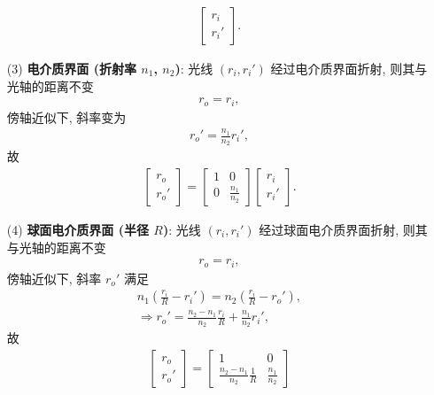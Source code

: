 \documentclass{note}
\begin{document}
\begin{pf}
\begin{itemize}
\begin{align}
\begin{bmatrix}
                r_i\\
                r_i'
            \end{bmatrix}.
        \end{align}
        \item[(3)] \textbf{电介质界面 (折射率 $n_1$, $n_2$)}: 光线 $(r_i,r_i')$ 经过电介质界面折射, 则其与光轴的距离不变
        \begin{align}
            r_o=r_i,
        \end{align}
        傍轴近似下, 斜率变为
        \begin{align}
            r_o'=\frac{n_1}{n_2}r_i',
        \end{align}
        故
        \begin{align}
            \begin{bmatrix}
                r_o\\
                r_o'
            \end{bmatrix}=\begin{bmatrix}
                1&0\\
                0&\frac{n_1}{n_2}
            \end{bmatrix}\begin{bmatrix}
                r_i\\
                r_i'
            \end{bmatrix}.
        \end{align}
        \item[(4)] \textbf{球面电介质界面 (半径 $R$)}: 光线 $(r_i,r_i')$ 经过球面电介质界面折射, 则其与光轴的距离不变
        \begin{align}
            r_o=r_i,
        \end{align}
        傍轴近似下, 斜率 $r_o'$ 满足
        \begin{gather}
            n_1\left(\frac{r_i}{R}-r_i'\right)=n_2\left(\frac{r_i}{R}-r_o'\right),\\
            \Longrightarrow r_o'=\frac{n_2-n_1}{n_2}\frac{r_i}{R}+\frac{n_1}{n_2}r_i',
        \end{gather}
        故
        \begin{align}
            \begin{bmatrix}
                r_o\\
                r_o'
            \end{bmatrix}=\begin{bmatrix}
                1&0\\
                \frac{n_2-n_1}{n_2}\frac{1}{R}&\frac{n_1}{n_2}

\end{bmatrix}
\end{align}
\end{itemize}
\end{pf}
\end{document}
